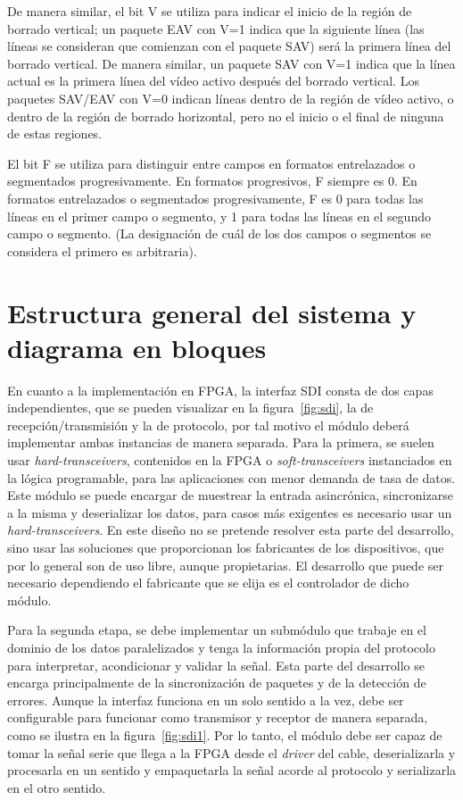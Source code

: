 De manera similar, el bit V se utiliza para indicar el inicio de la región de borrado vertical; un
paquete EAV con V=1 indica que la siguiente línea (las líneas se consideran que comienzan con el
paquete SAV) será la primera línea del borrado vertical. De manera similar, un paquete SAV con V=1
indica que la línea actual es la primera línea del vídeo activo después del borrado vertical. Los
paquetes SAV/EAV con V=0 indican líneas dentro de la región de vídeo activo, o dentro de la región
de borrado horizontal, pero no el inicio o el final de ninguna de estas regiones.

El bit F se utiliza para distinguir entre campos en formatos entrelazados o segmentados
progresivamente. En formatos progresivos, F siempre es 0. En formatos entrelazados o segmentados
progresivamente, F es 0 para todas las líneas en el primer campo o segmento, y 1 para todas las
líneas en el segundo campo o segmento. (La designación de cuál de los dos campos o segmentos se
considera el primero es arbitraria).

\section{Estructura general del sistema y diagrama en bloques}

En cuanto a la implementación en FPGA, la interfaz SDI consta de dos capas
independientes, que se pueden visualizar en la figura~\ref{fig:sdi}, la de
recepción/transmisión y la de protocolo, por tal motivo el módulo deberá
implementar ambas instancias de manera separada. Para la primera, se suelen
usar \textit{hard-transceivers}, contenidos en la FPGA o \textit{soft-transceivers}
instanciados en la lógica programable, para las aplicaciones con menor demanda
de tasa de datos. Este módulo se puede encargar de muestrear la entrada
asincrónica, sincronizarse a la misma y deserializar los datos, para casos más
exigentes es necesario usar un \textit{hard-transceivers}. En este diseño no se
pretende resolver esta parte del desarrollo, sino usar las soluciones que
proporcionan los fabricantes de los dispositivos, que por lo general son de uso
libre, aunque propietarias. El desarrollo que puede ser necesario dependiendo
el fabricante que se elija es el controlador de dicho módulo.

Para la segunda etapa, se debe implementar un submódulo que trabaje en el dominio
de los datos paralelizados y tenga la información propia del protocolo para
interpretar, acondicionar y validar la señal. Esta parte del desarrollo se
encarga principalmente de la sincronización de paquetes y de la detección de
errores. Aunque la interfaz funciona en un solo sentido a la vez, debe ser
configurable para funcionar como transmisor y receptor de manera separada, como
se ilustra en la figura~\ref{fig:sdi1}. Por lo tanto, el módulo debe ser capaz
de tomar la señal serie que llega a la FPGA desde el \textit{driver} del cable,
deserializarla y procesarla en un sentido y empaquetarla la señal acorde al
protocolo y serializarla en el otro sentido.

